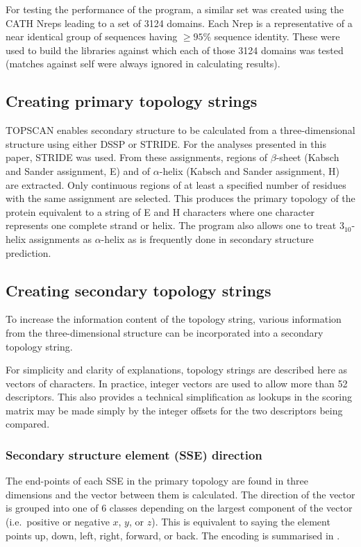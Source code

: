 \documentclass{article}
\newcommand{\htt}{\mbox{$3_{10}$}}
\begin{document}
For testing the performance of the program, a similar set was created
using the CATH Nreps leading to a set of 3124 domains. Each Nrep is a
representative of a near identical group of sequences having $\ge
95$\% sequence identity. These were used to build the libraries
against which each of those 3124 domains was tested (matches against
self were always ignored in calculating results).


\subsection{Creating primary topology strings}
TOPSCAN enables secondary structure to be calculated from a
three-dimensional structure using either DSSP\cite{kabsch:dictionary}
or STRIDE\cite{frishman:ssassign}. For the analyses presented in this
paper, STRIDE was used.  From these assignments, regions of
$\beta$-sheet (Kabsch and Sander assignment, E) and of $\alpha$-helix
(Kabsch and Sander assignment, H) are extracted. Only continuous
regions of at least a specified number of residues with the same
assignment are selected.  This produces the primary topology of the
protein equivalent to a string of E and H characters where one
character represents one complete strand or helix. The program also
allows one to treat \htt-helix assignments as $\alpha$-helix as is
frequently done in secondary structure prediction.

\subsection{Creating secondary topology strings}
To increase the information content of the topology string, various
information from the three-dimensional structure can be incorporated
into a secondary topology string. 

For simplicity and clarity of explanations, topology strings are
described here as vectors of characters. In practice, integer vectors
are used to allow more than 52 descriptors. This also provides a
technical simplification as lookups in the scoring matrix may be made
simply by the integer offsets for the two descriptors being compared.

\subsubsection{Secondary structure element (SSE) direction}
The end-points of each SSE in the primary topology are found in three
dimensions and the vector between them is calculated. The direction of
the vector is grouped into one of 6 classes depending on the largest
component of the vector (i.e.\ positive or negative $x$, $y$, or
$z$). This is equivalent to saying the element points up, down, left,
right, forward, or back. The encoding is summarised in
\tableref{\ref{tab:encoding}}.
\end{document}
